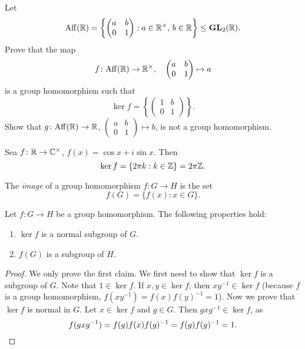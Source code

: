 \begin{exercise}
\label{xca:affine}
Let
\[
\mathrm{Aff}(\mathbb{R})=\left\{\begin{pmatrix}a&b\\0&1\end{pmatrix}:a\in\mathbb{R}^\times,\,b\in\mathbb{R}\right\}\leq\mathbf{GL}_2(\mathbb{R}).
\]
Prove that the map
\[
f\colon \mathrm{Aff}(\mathbb{R})\to\mathbb{R}^\times,\quad
\begin{pmatrix}
a&b\\
0&1
\end{pmatrix}
\mapsto a
\]
is a group homomorphism such that 
\[
\ker f=\left\{\begin{pmatrix}
1&b\\
0&1
\end{pmatrix}
\right\}.
\]
Show that $g\colon\mathrm{Aff}(\mathbb{R})\to\mathbb{R}$, $\begin{pmatrix}a&b\\0&1\end{pmatrix}\mapsto b$,
is not a group homomorphism.
\end{exercise}



\begin{example}
Sea $f\colon\mathbb{R}\to\mathbb{C}^\times$, $f(x)=\cos x+i\sin x$. Then 
\[
\ker f=\{2\pi k:k\in\mathbb{Z}\}=2\pi\mathbb{Z}.
\]
\end{example}

\begin{definition}
The \emph{image} of a group homomorphism $f\colon G\to H$
is the set 
\[
f(G)=\{f(x):x\in G\}.
\]
\end{definition}

\begin{proposition}
    Let $f\colon G\to H$ be a group homomorphism.
    The following properties hold: 
        \begin{enumerate}
                \item $\ker f$ is a normal subgroup of $G$.
                \item $f(G)$ is a subgroup of $H$.
        \end{enumerate}
\end{proposition}

\begin{proof}
    We only prove the first claim. We first need to show that 
    $\ker f$ is a subgroup of $G$. Note that
    $1\in \ker f$. If $x,y\in\ker f$, then
    $xy^{-1}\in\ker f$ (because $f$ is a group homomorphism, 
    $f(xy^{-1})=f(x)f(y)^{-1}=1$). Now we prove that $\ker f$ is normal in $G$. Let $x\in\ker f$ and $g\in G$. Then $gxg^{-1}\in\ker f$, as 
    \[
    f(gxg^{-1})=f(g)f(x)f(g)^{-1}=f(g)f(g)^{-1}=1.\qedhere
    \]
\end{proof}

